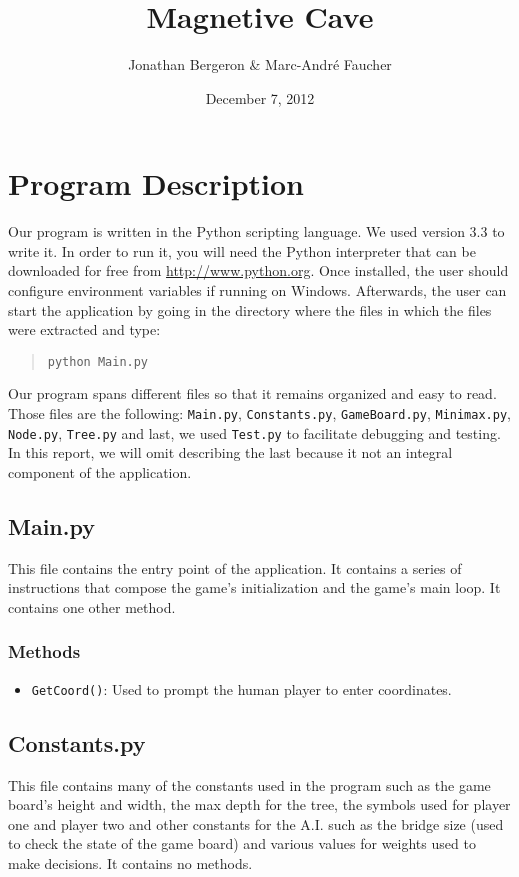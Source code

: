 \documentclass[10pt]{article}
\title{Magnetive Cave}
\author{Jonathan Bergeron \& Marc-André Faucher}
\date{December 7, 2012}
\begin{document}
\maketitle
\section{Program Description} 

Our program is written in the Python scripting language. We used version 3.3 to write it.
In order to run it, you will need the Python interpreter that can be downloaded for free
from \url{http://www.python.org}. Once installed, the user should configure environment
variables if running on Windows. Afterwards, the user can start the application by going
in the directory where the files in which the files were extracted and type: 
\begin{quote}
\texttt{python Main.py}
\end{quote}
Our program spans different files so that it remains organized and easy to read. Those files
are the following: \texttt{Main.py}, \texttt{Constants.py}, \texttt{GameBoard.py},
\texttt{Minimax.py}, \texttt{Node.py}, \texttt{Tree.py} and last, we used \texttt{Test.py}
to facilitate debugging and testing. In this report, we will omit describing the last because
it not an integral component of the application.

\subsection{Main.py}
This file contains the entry point of the application. It contains a series of instructions
that compose the game’s initialization and the game’s main loop. It contains one other method. \\

\subsubsection*{Methods}
\begin{itemize}
\item \texttt{GetCoord()}: Used to prompt the human player to enter coordinates.
\end{itemize}

\subsection{Constants.py}
This file contains many of the constants used in the program such as the game board's height
and width, the max depth for the tree, the symbols used for player one and player two and
other constants for the A.I. such as the bridge size (used to check the state of the game
board) and various values for weights used to make decisions. It contains no methods.
\end{document}
